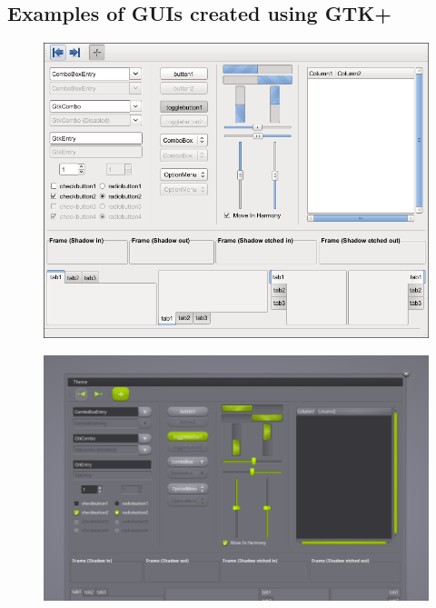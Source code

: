 \documentclass[12pt]{article}
\begin{document}
\clearpage

\subsection{Examples of GUIs created using GTK+}

\begin{figure}[h!]
\centering
\includegraphics[scale=0.4]{gui1}
\end{figure}

\begin{figure}[h!]
\centering
\includegraphics[scale=0.5]{gui2}
\end{figure}

\clearpage
\end{document}
